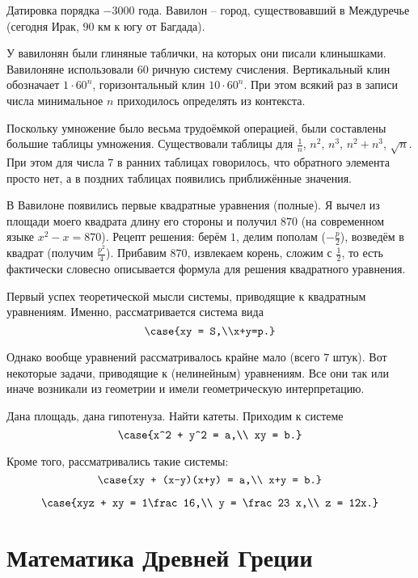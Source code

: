 \documentclass[a4paper,oneside,fleqn,10pt]{article}
\begin{document}
Датировка порядка $-3000$ года.  Вавилон -- город, существовавший в
Междуречье (сегодня Ирак, 90 км к югу от Багдада).

У вавилонян были глиняные таблички, на которых они писали клинышками.
Вавилоняне использовали 60 ричную систему счисления. Вертикальный клин
обозначает $1\cdot 60^n$, горизонтальный клин $10\cdot 60^n$.  При
этом всякий раз в записи числа минимальное $n$ приходилось определять
из контекста.

Поскольку умножение было весьма трудоёмкой операцией, были составлены
большие таблицы умножения. Существовали таблицы для $\frac1n$, $n^2$,
$n^3$, $n^2+ n^3$, $\sqrt n$.  При этом для числа $7$ в ранних
таблицах говорилось, что обратного элемента просто нет, а в поздних
таблицах появились приближённые значения.

В Вавилоне появились первые квадратные уравнения (полные).  Я вычел из
площади моего квадрата длину его стороны и получил $870$ (на
современном языке $x^2-x=870$). Рецепт решения: берём $1$, делим
пополам ($-\frac{p}{2}$), возведём в квадрат (получим
$\frac{p^2}{4}$). Прибавим $870$, извлекаем корень, сложим с
$\frac{1}{2}$, то есть фактически словесно описывается формула для
решения квадратного уравнения.

Первый успех теоретической мысли системы, приводящие к квадратным
уравнениям.  Именно, рассматривается система вида
$$\case{xy = S,\\x+y=p.}$$

Однако вообще уравнений рассматривалось крайне мало (всего $7$ штук).
Вот некоторые задачи, приводящие к (нелинейным) уравнениям. Все они
так или иначе возникали из геометрии и имели геометрическую
интерпретацию.

Дана площадь, дана гипотенуза. Найти катеты. Приходим к системе
$$\case{x^2 + y^2 = a,\\ xy = b.}$$

Кроме того, рассматривались такие системы:
$$\case{xy + (x-y)(x+y) = a,\\ x+y = b.}$$

$$\case{xyz + xy = 1\frac16,\\ y = \frac23 x,\\ z = 12x.}$$


\section{Математика Древней Греции}
\end{document}
